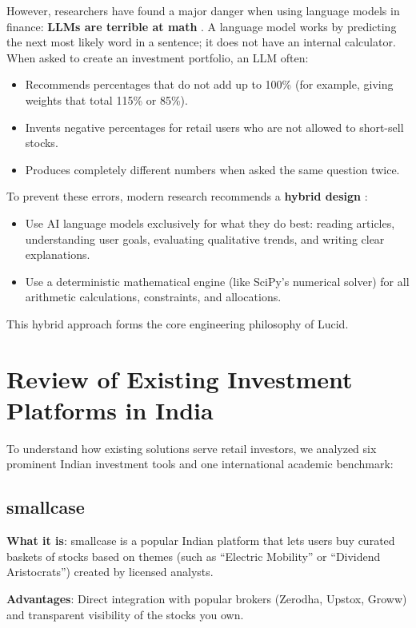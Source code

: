 However, researchers have found a major danger when using language models in finance: \textbf{LLMs are terrible at math} \cite{kulpa2025}. A language model works by predicting the next most likely word in a sentence; it does not have an internal calculator. When asked to create an investment portfolio, an LLM often:
\begin{itemize}
    \item Recommends percentages that do not add up to 100\% (for example, giving weights that total 115\% or 85\%).
    \item Invents negative percentages for retail users who are not allowed to short-sell stocks.
    \item Produces completely different numbers when asked the same question twice.
\end{itemize}

To prevent these errors, modern research recommends a \textbf{hybrid design} \cite{fatouros2024}:
\begin{itemize}
    \item Use AI language models exclusively for what they do best: reading articles, understanding user goals, evaluating qualitative trends, and writing clear explanations.
    \item Use a deterministic mathematical engine (like SciPy's numerical solver) for all arithmetic calculations, constraints, and allocations.
\end{itemize}
This hybrid approach forms the core engineering philosophy of Lucid.

\section{Review of Existing Investment Platforms in India}
To understand how existing solutions serve retail investors, we analyzed six prominent Indian investment tools and one international academic benchmark:

\subsection{smallcase}
\textbf{What it is}: smallcase is a popular Indian platform that lets users buy curated baskets of stocks based on themes (such as ``Electric Mobility'' or ``Dividend Aristocrats'') created by licensed analysts.

\textbf{Advantages}: Direct integration with popular brokers (Zerodha, Upstox, Groww) and transparent visibility of the stocks you own.


